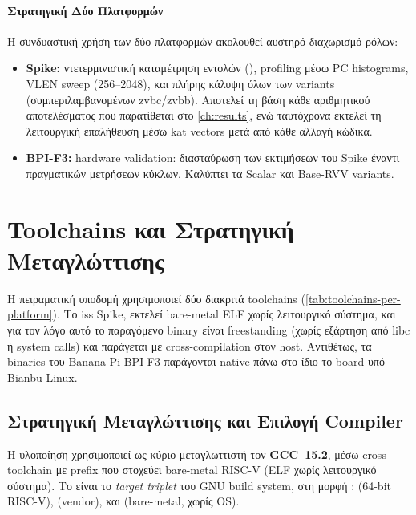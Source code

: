 \paragraph{Στρατηγική Δύο Πλατφορμών}

Η συνδυαστική χρήση των δύο πλατφορμών ακολουθεί αυστηρό διαχωρισμό ρόλων:

\begin{itemize}
  \item \textbf{Spike:} ντετερμινιστική καταμέτρηση εντολών (\instret), profiling
    μέσω PC histograms, VLEN sweep (\num{256}–\num{2048}), και πλήρης κάλυψη
    όλων των variants (συμπεριλαμβανομένων \gls{zvbc}/\gls{zvbb}). Αποτελεί τη βάση
    κάθε αριθμητικού αποτελέσματος που παρατίθεται στο \cref{ch:results}, ενώ ταυτόχρονα 
    εκτελεί τη λειτουργική επαλήθευση μέσω \gls{kat} vectors μετά από κάθε αλλαγή κώδικα.
  \item \textbf{BPI-F3:} hardware validation: διασταύρωση των εκτιμήσεων 
    \instret του Spike έναντι πραγματικών μετρήσεων κύκλων. Καλύπτει τα Scalar και Base-RVV variants.
\end{itemize}

\section{Toolchains και Στρατηγική Μεταγλώττισης}
\label{sec:toolchains}

Η πειραματική υποδομή χρησιμοποιεί δύο διακριτά toolchains (\cref{tab:toolchains-per-platform}). Το
\gls{iss} Spike, εκτελεί bare-metal ELF χωρίς λειτουργικό σύστημα, και για τον
λόγο αυτό το παραγόμενο binary είναι freestanding (χωρίς εξάρτηση από libc ή
system calls) και παράγεται με cross-compilation στον host. Αντιθέτως, τα
binaries του Banana Pi BPI-F3 παράγονται native πάνω στο
ίδιο το board υπό Bianbu Linux.

\subsection{Στρατηγική Μεταγλώττισης και Επιλογή Compiler}
\label{ssec:compiler-strategy}

Η υλοποίηση χρησιμοποιεί ως κύριο μεταγλωττιστή τον \textbf{GCC~15.2}, μέσω
cross-toolchain με prefix  που στοχεύει bare-metal
RISC-V (ELF χωρίς λειτουργικό σύστημα). Το  είναι το
\emph{target triplet} του GNU build system, στη μορφή
:  (64-bit RISC-V),
 (vendor), και  (bare-metal, χωρίς OS).


